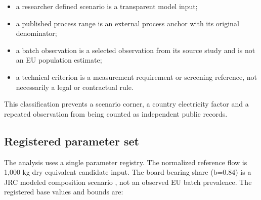 \documentclass[pdflatex,sn-basic]{sn-jnl}
\begin{document}
\begin{itemize}

\item
  a researcher defined scenario is a transparent model input;
\item
  a published process range is an external process anchor with its original denominator;
\item
  a batch observation is a selected observation from its source study and is not an EU population estimate;
\item
  a technical criterion is a measurement requirement or screening reference, not necessarily a legal or contractual rule.
\end{itemize}

This classification prevents a scenario corner, a country electricity factor and a repeated observation from being counted as independent public records.

\subsection{Registered parameter set}\label{registered-parameter-set}

The analysis uses a single parameter registry. The normalized reference flow is 1,000 kg dry equivalent candidate input. The board bearing share (b=0.84) is a JRC modeled composition scenario \citep{cristobal2024}, not an observed EU batch prevalence. The registered base values and bounds are:
\end{document}
